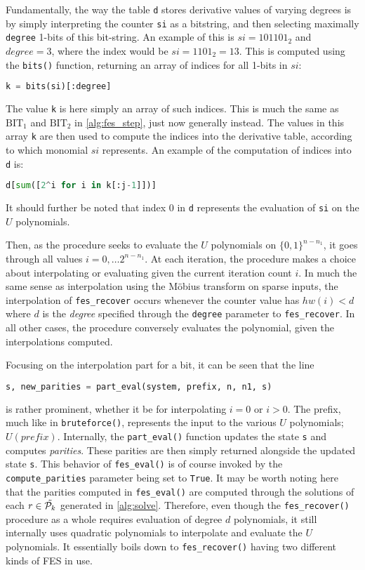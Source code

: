 Fundamentally, the way the table \texttt{d} stores derivative values of varying degrees is by simply interpreting the counter \texttt{si} as a bitstring, and then selecting maximally \texttt{degree} 1-bits of this bit-string. An example of this is $si = 101101_2$ and $degree = 3$, where the index would be $si = 1101_2 = 13$. This is computed using the \texttt{bits()} function, returning an array of indices for all 1-bits in $si$:
\begin{lstlisting}[language=Python,style=mystyle]
k = bits(si)[:degree]
\end{lstlisting}
The value \texttt{k} is here simply an array of such indices. This is much the same as $\text{BIT}_1$ and $\text{BIT}_2$ in \cref{alg:fes_step}, just now generally instead. The values in this array \texttt{k} are then used to compute the indices into the derivative table, according to which monomial $si$ represents. An example of the computation of indices into \texttt{d} is:
\begin{lstlisting}[language=Python,style=mystyle]
d[sum([2^i for i in k[:j-1]])]
\end{lstlisting}
It should further be noted that index $0$ in \texttt{d} represents the evaluation of \texttt{si} on the $U$ polynomials. 

Then, as the procedure seeks to evaluate the $U$ polynomials on $\{0,1\}^{n - n_1}$, it goes through all values $i = 0, \dots 2^{n - n_1}$. At each iteration, the procedure makes a choice about interpolating or evaluating given the current iteration count $i$. In much the same sense as interpolation using the Möbius transform on sparse inputs, the interpolation of \texttt{fes\_recover} occurs whenever the counter value has $hw(i) < d$ where $d$ is the \textit{degree} specified through the \texttt{degree} parameter to \texttt{fes\_recover}. In all other cases, the procedure conversely evaluates the polynomial, given the interpolations computed.

Focusing on the interpolation part for a bit, it can be seen that the line
\begin{lstlisting}[language=Python,style=mystyle]
s, new_parities = part_eval(system, prefix, n, n1, s)
\end{lstlisting}
is rather prominent, whether it be for interpolating $i = 0$ or $i > 0$. The prefix, much like in \texttt{bruteforce()}, represents the input to the various $U$ polynomials; $U(prefix)$. Internally, the \texttt{part\_eval()} function updates the state \texttt{s} and computes \textit{parities}. These parities are then simply returned alongside the updated state \texttt{s}. This behavior of \texttt{fes\_eval()} is of course invoked by the \texttt{compute\_parities} parameter being set to \texttt{True}. It may be worth noting here that the parities computed in \texttt{fes\_eval()} are computed through the solutions of each $r \in \Tilde{\mathcal{P}_k}$ generated in \cref{alg:solve}. Therefore, even though the \texttt{fes\_recover()} procedure as a whole requires evaluation of degree $d$ polynomials, it still internally uses quadratic polynomials to interpolate and evaluate the $U$ polynomials. It essentially boils down to \texttt{fes\_recover()} having two different kinds of FES in use.

